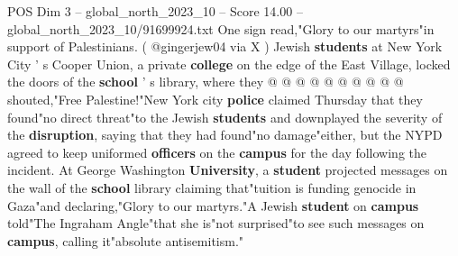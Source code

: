 \begin{textsample}{POS Dim 3 – global\_north\_2023\_10 – Score 14.00 – global\_north\_2023\_10/91699924.txt}
One sign read,"Glory to our martyrs"in support of Palestinians. ( @gingerjew04 via X ) Jewish \textbf{students} at New York City ' s Cooper Union, a private \textbf{college} on the edge of the East Village, locked the doors of the \textbf{school} ' s library, where they @ @ @ @ @ @ @ @ @ @ shouted,"Free Palestine!"New York city \textbf{police} claimed Thursday that they found"no direct threat"to the Jewish \textbf{students} and downplayed the severity of the \textbf{disruption}, saying that they had found"no damage"either, but the NYPD agreed to keep uniformed \textbf{officers} on the \textbf{campus} for the day following the incident.
At George Washington \textbf{University}, a \textbf{student} projected messages on the wall of the \textbf{school} library claiming that"tuition is funding genocide in Gaza"and declaring,"Glory to our martyrs."A Jewish \textbf{student} on \textbf{campus} told"The Ingraham Angle"that she is"not surprised"to see such messages on \textbf{campus}, calling it"absolute antisemitism."

\end{textsample}

